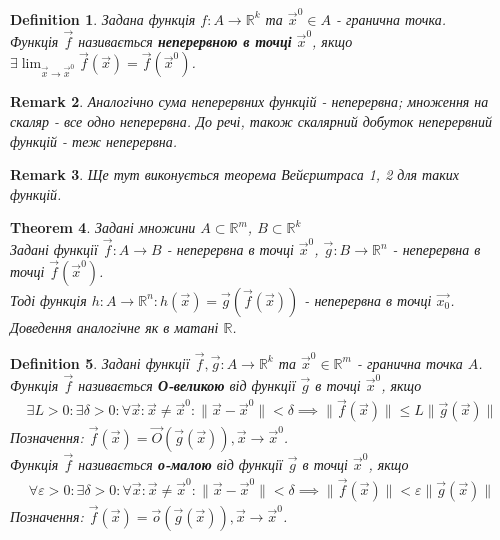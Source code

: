 \documentclass[a4paper, 10pt]{article}
\def\huge{\displaystyle}
\theoremstyle{theoremdd}
\newtheorem{theorem}{Theorem}[subsection]
\theoremstyle{theoremdd}
\theoremstyle{theoremdd}
\newtheorem{definition}[theorem]{Definition}
\theoremstyle{theoremdd}
\theoremstyle{theoremdd}
\theoremstyle{theoremdd}
\theoremstyle{theoremdd}
\newtheorem{remark}[theorem]{Remark}
\theoremstyle{theoremdd}
\theoremstyle{theoremdd}
\newcommand\Norm[1]{\|#1\|}
\begin{document}
\begin{definition}
Задана функція $f: A \to \mathbb{R}^k$ та $\vec{x}^0 \in A$ - гранична точка.\\
Функція $\vec{f}$ називається \textbf{неперервною в точці} $\vec{x}^0$, якщо $\exists \huge \lim_{\vec{x} \to \vec{x}^0} \vec{f}(\vec{x}) = \vec{f}(\vec{x}^0)$.
\end{definition}

\begin{remark}
Аналогічно сума неперервних функцій - неперервна; множення на скаляр - все одно неперервна. До речі, також скалярний добуток неперервний функцій - теж неперервна.
\end{remark}

\begin{remark}
Ще тут виконується теорема Вейєрштраса 1, 2 для таких функцій.
\end{remark}

\begin{theorem}
Задані множини $A \subset \mathbb{R}^m$, $B \subset \mathbb{R}^k$\\
Задані функції $\vec{f}: A \to B$ - неперервна в точці $\vec{x}^0$, $\vec{g}: B \to \mathbb{R}^n$ - неперервна в точці $\vec{f}(\vec{x}^0)$.\\
Тоді функція $h: A \to \mathbb{R}^n: h(\vec{x}) = \vec{g}(\vec{f}(\vec{x}))$ - неперервна в точці $\vec{x_0}$.\\
\textit{Доведення аналогічне як в матані $\mathbb{R}$.}
\end{theorem}

\begin{definition}
Задані функції $\vec{f},\vec{g}: A \to \mathbb{R}^k$ та $\vec{x}^0 \in \mathbb{R}^m$ - гранична точка $A$.\\
Функція $\vec{f}$ називається \textbf{О-великою} від функції $\vec{g}$ в точці $\vec{x}^0$, якщо
\begin{align*}
\exists L>0: \exists \delta > 0: \forall \vec{x}: \vec{x} \neq \vec{x}^0: \Norm{\vec{x} - \vec{x}^0} < \delta \implies \Norm{\vec{f}(\vec{x})} \leq L \Norm{\vec{g}(\vec{x})}
\end{align*}
Позначення: $\vec{f}(\vec{x}) = \vec{O}(\vec{g}(\vec{x})), \vec{x} \to \vec{x}^0$.\\
Функція $\vec{f}$ називається \textbf{о-малою} від функції $\vec{g}$ в точці $\vec{x}^0$, якщо
\begin{align*}
\forall \varepsilon>0: \exists \delta > 0: \forall \vec{x}: \vec{x} \neq \vec{x}^0: \Norm{\vec{x} - \vec{x}^0} < \delta \implies \Norm{\vec{f}(\vec{x})} < \varepsilon \Norm{\vec{g}(\vec{x})}
\end{align*}
Позначення: $\vec{f}(\vec{x}) = \vec{o}(\vec{g}(\vec{x})), \vec{x} \to \vec{x}^0$.
\end{definition}
\end{document}
